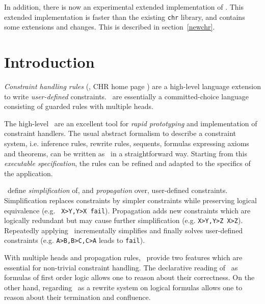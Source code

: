 In addition, there is now an experimental extended implementation of {\chrs}. 
This extended implementation is faster than the existing {\tt chr} library,
and contains some extensions and changes. This is described in 
section~\ref{newchr}.

\section{Introduction}

{\em Constraint handling rules} (\chrs,
CHR home page )
\cite{fru92}
are a high-level language
extension to write {\em user-defined} constraints. \chrs\ are
essentially a committed-choice language consisting of guarded rules with
multiple heads.

The high-level \chrs\ are an excellent tool for {\em rapid prototyping} and
implementation of constraint handlers. The usual abstract formalism to
describe a constraint system, i.e. inference rules, rewrite rules,
sequents, formulas expressing axioms and theorems, can be written as
\chrs\ in a straightforward way.  Starting from this {\em executable
specification}, the rules can be refined and adapted
to the specifics of the application.  

\chrs\ define {\em simplification} of, and {\em propagation} over, 
user-defined constraints.  Simplification replaces constraints by
simpler constraints while preserving logical equivalence (e.g.  {\tt
X>Y,Y>X
\rep fail}).  Propagation adds new constraints which are logically
redundant but may cause further simplification (e.g. {\tt X>Y,Y>Z \aug
X>Z}).  Repeatedly applying \chrs\ incrementally simplifies and
finally solves user-defined constraints (e.g. {\tt A>B,B>C,C>A}
leads to {\tt fail}).  

With multiple heads and propagation rules,
\chrs\ provide two features which are essential for non-trivial
constraint handling.
The declarative reading of
\chrs\ as formulas of first order logic 
allows one to reason about their correctness.  On the other hand, 
regarding \chrs\ as a rewrite system on logical formulas allows one to
reason about their termination and confluence.


